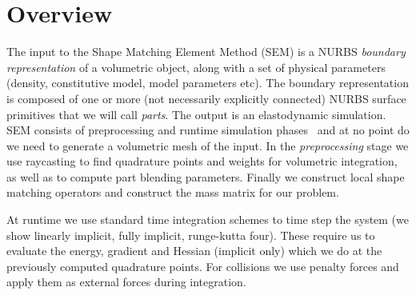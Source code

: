 \section{Overview}
The input to the Shape Matching Element Method (SEM)  is a NURBS \emph{boundary representation} of a volumetric object, along with a set of physical parameters 
(density, constitutive model, model parameters etc). 
The boundary representation is composed of one or more (not necessarily explicitly connected) NURBS surface primitives that we will call \emph{parts}.
The output is an elastodynamic simulation. 
SEM consists of preprocessing and runtime simulation phases~ and at no point do we need to generate a volumetric mesh of the input. 
In the \emph{preprocessing} stage we use raycasting to find quadrature points and weights for volumetric integration, as well as to compute part blending parameters. 
Finally we construct local shape matching operators and construct the mass matrix for our problem. 

At runtime we use standard time integration schemes to time step the system (we show linearly implicit, fully implicit, runge-kutta four). 
These require us to evaluate the energy, gradient and Hessian (implicit only) which we do at the previously computed quadrature points. 
For collisions we use penalty forces and apply them as external forces during integration.

